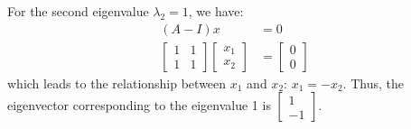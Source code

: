 \documentclass[11pt]{article}
\begin{document}
{{\begin{enumerate}
            For the second eigenvalue $\lambda_2=1$, we have:
            \begin{equation}
            \begin{split}
                (A-I)x &= 0\\
                \begin{bmatrix}
                1 & 1\\
                1 & 1
                \end{bmatrix}
                \begin{bmatrix}
                x_1\\x_2
                \end{bmatrix}
                &=\begin{bmatrix}
                0\\0
                \end{bmatrix}
            \end{split}
            \end{equation}
            which leads to the relationship between $x_1$ and $x_2$: $x_1=-x_2$. Thus, the eigenvector corresponding to the eigenvalue 1 is $\begin{bmatrix}
            1\\-1
            \end{bmatrix}$.


\end{enumerate}}}
\end{document}
